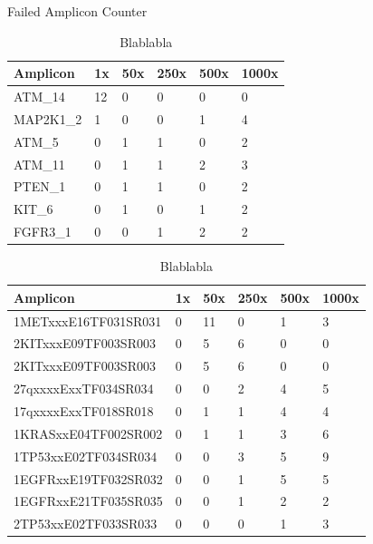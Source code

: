 


Failed Amplicon Counter

\begin{table}[!htbp]
  \caption[failed_halo]{Blablabla}
  \centering
    \begin{tabular}{|p{2cm}||p{1.1cm}|p{1.1cm}|p{1.1cm}|p{1.1cm}|p{1.1cm}|}
      \hline
      Amplicon & 1x & 50x & 250x & 500x & 1000x \\ \hline \hline
      ATM\_14 & 12 & 0 & 0 & 0 & 0 \\
      MAP2K1\_2 & 1 & 0 & 0 & 1 & 4 \\
      ATM\_5 & 0 & 1 & 1 & 0 & 2 \\
      ATM\_11 & 0 & 1 & 1 & 2 & 3 \\
      PTEN\_1 & 0 & 1 & 1 & 0 & 2 \\
      KIT\_6 & 0 & 1 & 0 & 1 & 2 \\
      FGFR3\_1 & 0 & 0 & 1 & 2 & 2 \\ \hline
    \end{tabular}
\end{table}

\begin{table}[!htbp]
  \caption[failed_halo]{Blablabla}
  \centering
    \begin{tabular}{|p{5cm}||p{1.1cm}|p{1.1cm}|p{1.1cm}|p{1.1cm}|p{1.1cm}|}
    \hline
    Amplicon & 1x & 50x & 250x & 500x & 1000x \\ \hline \hline
    1METxxxE16TF031SR031 & 0 & 11 & 0 & 1 & 3 \\
    2KITxxxE09TF003SR003 & 0 & 5 & 6 & 0 & 0 \\
    2KITxxxE09TF003SR003 & 0 & 5 & 6 & 0 & 0 \\
    27qxxxxExxTF034SR034 & 0 & 0 & 2 & 4 & 5 \\
    17qxxxxExxTF018SR018 & 0 & 1 & 1 & 4 & 4 \\
    1KRASxxE04TF002SR002 & 0 & 1 & 1 & 3 & 6 \\
    1TP53xxE02TF034SR034 & 0 & 0 & 3 & 5 & 9 \\
    1EGFRxxE19TF032SR032 & 0 & 0 & 1 & 5 & 5 \\
    1EGFRxxE21TF035SR035 & 0 & 0 & 1 & 2 & 2 \\
    2TP53xxE02TF033SR033 & 0 & 0 & 0 & 1 & 3 \\
    \hline
  \end{tabular}
\end{table}


